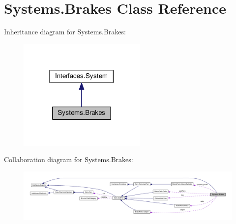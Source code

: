 \hypertarget{classSystems_1_1Brakes}{}\section{Systems.\+Brakes Class Reference}
\label{classSystems_1_1Brakes}


Inheritance diagram for Systems.\+Brakes\+:\nopagebreak
\begin{figure}[H]
\begin{center}
\leavevmode
\includegraphics[width=177pt]{classSystems_1_1Brakes__inherit__graph}
\end{center}
\end{figure}


Collaboration diagram for Systems.\+Brakes\+:
\nopagebreak
\begin{figure}[H]
\begin{center}
\leavevmode
\includegraphics[width=350pt]{classSystems_1_1Brakes__coll__graph}
\end{center}
\end{figure}

